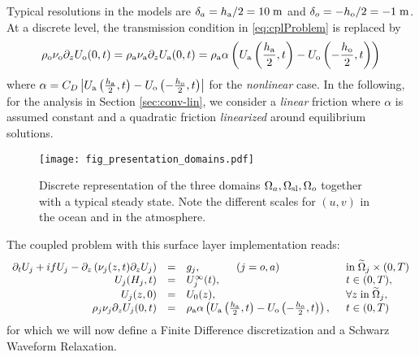 %
Typical resolutions in the  models are 
$\delta_a=h_{\rm a}/2=10\;{\rm m}$ and $\delta_o=-h_{\rm o}/2=-1\;{\rm m}$.
At a discrete level, the transmission condition in \eqref{eq:cplProblem}
is replaced by
%
\begin{equation}\label{eq:discreteCouplingConditions}
    \rho_{\rm o} \nu_{\rm o} \partial_z U_{\rm o}(0,t)
    = \rho_{\rm a} \nu_{\rm a} \partial_z U_{\rm a}(0,t)
    = \rho_{\rm a} \alpha \left(
    U_{\rm a}\left( \frac{h_{\rm a}}{2},t \right) - U_{\rm o}\left(-\frac{h_{\rm o}}{2},t \right)
    \right)
\end{equation}
%
where 
$\alpha= C_D \left| U_{\rm a}\left( \frac{h_{\rm a}}{2},t \right) - U_{\rm o}\left(-\frac{h_{\rm o}}{2},t \right) \right|$ for the \textit{nonlinear} case.
In the following, for the analysis in Section \ref{sec:conv-lin}, we  consider 
a \textit{linear} friction where $\alpha$ is assumed constant and a 
quadratic friction \textit{linearized} around equilibrium solutions.
\begin{figure}
    \centering
    \texttt{[image: fig\_presentation\_domains.pdf]}
    \caption{Discrete representation of the three domains $\Omega_a, \Omega_{\rm sl}, \Omega_o$ together with a typical steady state. Note the different scales for $(u,v)$ in the ocean and in the atmosphere.}
    \label{fig:presentationDomains}
\end{figure}
The coupled problem with this surface layer implementation reads:
\begin{equation}
\label{eq:OASchwarz_cplProblem}
\begin{array}{rcll}
\partial_t U_j + i f U_j - \partial_z \left( \nu_j(z,t) \partial_z U_j \right) &=& g_j,
~~~~~~~~~~ (j=o,a)
	& \mbox{in}\;\widetilde{\Omega}_j \times (0,T)\\
U_j(H_j,t) &=& U_j^\infty(t),  & t \in (0,T), \\ 
	U_j(z,0) &=& U_0(z), & \forall z \; \mbox{in}\; \widetilde{\Omega}_j, \\
\rho_j \nu_j \partial_z U_j(0,t)
&=&\rho_{\rm a} \alpha \left(
    U_{\rm a}\left( \frac{h_{\rm a}}{2},t \right) - U_{\rm o}\left(-\frac{h_{\rm o}}{2},t \right)
    \right), \;\; & t \in (0,T)
\end{array}
\end{equation}
for which we will now define a Finite Difference discretization and
a Schwarz Waveform Relaxation.
